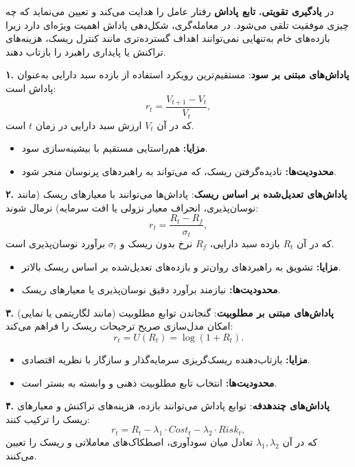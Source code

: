 \documentclass[12pt, a4paper]{report}
\begin{document}
در \textbf{یادگیری تقویتی}، \textbf{تابع پاداش}
رفتار عامل را هدایت می‌کند و تعیین می‌نماید که چه چیزی موفقیت تلقی می‌شود. در معامله‌گری، 
شکل‌دهی پاداش اهمیت ویژه‌ای دارد زیرا بازده‌های خام به‌تنهایی نمی‌توانند اهداف گسترده‌تری مانند 
کنترل ریسک، هزینه‌های تراکنش یا پایداری راهبرد را بازتاب دهند.  

\bigskip
\textbf{۱. پاداش‌های مبتنی بر سود}:  
مستقیم‌ترین رویکرد استفاده از بازده سبد دارایی به‌عنوان پاداش است:
\[
r_t = \frac{V_{t+1} - V_t}{V_t},
\]
که در آن $V_t$ ارزش سبد دارایی در زمان $t$ است.  
\begin{itemize}
    \item \textbf{مزایا:} هم‌راستایی مستقیم با بیشینه‌سازی سود.  
    \item \textbf{محدودیت‌ها:} نادیده‌گرفتن ریسک، که می‌تواند به راهبردهای پرنوسان منجر شود.  
\end{itemize}

\bigskip
\textbf{۲. پاداش‌های تعدیل‌شده بر اساس ریسک}:  
پاداش‌ها می‌توانند با معیارهای ریسک (مانند نوسان‌پذیری، انحراف معیار نزولی یا افت سرمایه) نرمال شوند:
\[
r_t = \frac{R_t - R_f}{\sigma_t},
\]
که در آن $R_t$ بازده سبد دارایی، $R_f$ نرخ بدون ریسک و $\sigma_t$ برآورد نوسان‌پذیری است.  
\begin{itemize}
    \item \textbf{مزایا:} تشویق به راهبردهای روان‌تر و بازده‌های تعدیل‌شده بر اساس ریسک بالاتر.  
    \item \textbf{محدودیت‌ها:} نیازمند برآورد دقیق نوسان‌پذیری یا معیارهای ریسک.  
\end{itemize}

\bigskip
\textbf{۳. پاداش‌های مبتنی بر مطلوبیت}:  
گنجاندن توابع مطلوبیت (مانند لگاریتمی یا نمایی) امکان مدل‌سازی صریح ترجیحات ریسک را فراهم می‌کند:
\[
r_t = U(R_t) = \log(1 + R_t).
\]
\begin{itemize}
    \item \textbf{مزایا:} بازتاب‌دهنده ریسک‌گریزی سرمایه‌گذار و سازگار با نظریه اقتصادی.  
    \item \textbf{محدودیت‌ها:} انتخاب تابع مطلوبیت ذهنی و وابسته به بستر است.  
\end{itemize}

\bigskip
\textbf{۴. پاداش‌های چندهدفه}:  
توابع پاداش می‌توانند بازده، هزینه‌های تراکنش و معیارهای ریسک را ترکیب کنند:
\[
r_t = R_t - \lambda_1 \cdot Cost_t - \lambda_2 \cdot Risk_t,
\]
که در آن $\lambda_1, \lambda_2$ تعادل میان سودآوری، اصطکاک‌های معاملاتی و ریسک را تعیین می‌کنند.  
\end{document}

